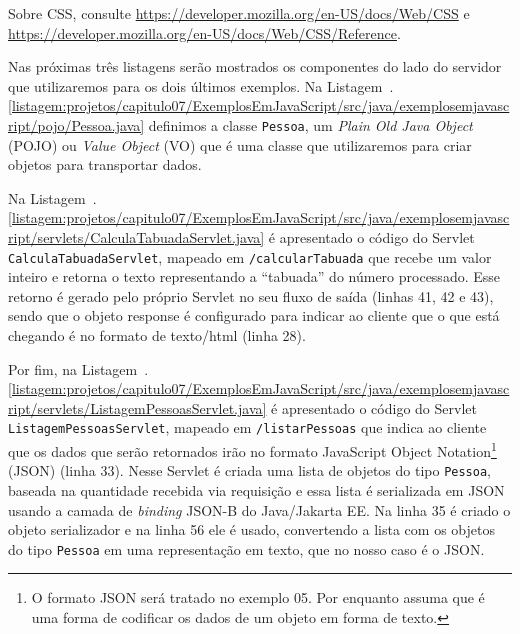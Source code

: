 
\begin{saibaMais}
    Sobre CSS, consulte \url{https://developer.mozilla.org/en-US/docs/Web/CSS} e \url{https://developer.mozilla.org/en-US/docs/Web/CSS/Reference}.
\end{saibaMais}

Nas próximas três listagens serão mostrados os componentes do lado do servidor que utilizaremos para os dois últimos exemplos. Na Listagem~\thechapter.\ref{listagem:projetos/capitulo07/ExemplosEmJavaScript/src/java/exemplosemjavascript/pojo/Pessoa.java} definimos a classe \texttt{Pessoa}, um \textit{Plain Old Java Object} (POJO) ou \textit{Value Object} (VO) que é uma classe que utilizaremos para criar objetos para transportar dados.


Na Listagem~\thechapter.\ref{listagem:projetos/capitulo07/ExemplosEmJavaScript/src/java/exemplosemjavascript/servlets/CalculaTabuadaServlet.java} é apresentado o código do Servlet \texttt{CalculaTabuadaServlet}, mapeado em \texttt{/calcularTabuada} que recebe um valor inteiro e retorna o texto representando a ``tabuada'' do número processado. Esse retorno é gerado pelo próprio Servlet no seu fluxo de saída (linhas 41, 42 e 43), sendo que o objeto response é configurado para indicar ao cliente que o que está chegando é no formato de texto/html (linha 28).


Por fim, na Listagem~\thechapter.\ref{listagem:projetos/capitulo07/ExemplosEmJavaScript/src/java/exemplosemjavascript/servlets/ListagemPessoasServlet.java} é apresentado o código do Servlet \texttt{ListagemPessoasServlet}, mapeado em \texttt{/listarPessoas} que indica ao cliente que os dados que serão retornados irão no formato JavaScript Object Notation\footnote{O formato JSON será tratado no exemplo 05. Por enquanto assuma que é uma forma de codificar os dados de um objeto em forma de texto.} (JSON) (linha 33). Nesse Servlet é criada uma lista de objetos do tipo \texttt{Pessoa}, baseada na quantidade recebida via requisição e essa lista é serializada em JSON usando a camada de \textit{binding} JSON-B do Java/Jakarta EE. Na linha 35 é criado o objeto serializador e na linha 56 ele é usado, convertendo a lista com os objetos do tipo \texttt{Pessoa} em uma representação em texto, que no nosso caso é o JSON.

